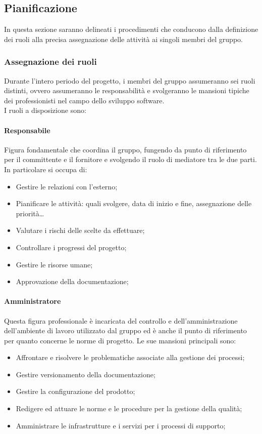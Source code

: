 \documentclass{article}
\begin{document}
    \subsection{Pianificazione}
    In questa sezione saranno delineati i procedimenti che conducono dalla definizione dei ruoli alla precisa assegnazione delle attività ai singoli membri del gruppo.
    \subsubsection{Assegnazione dei ruoli}

    Durante l'intero periodo del progetto, i membri del gruppo assumeranno sei ruoli distinti, ovvero assumeranno le responsabilità e svolgeranno le mansioni tipiche dei professionisti nel campo dello sviluppo software.
    \\I ruoli a disposizione sono:
        \paragraph{Responsabile}\label{responsabile} Figura fondamentale che coordina il gruppo, fungendo da punto di riferimento per il committente e il fornitore e svolgendo il ruolo di mediatore tra le due parti.\\
        In particolare si occupa di:
        \begin{itemize}
            \item Gestire le relazioni con l'esterno;
            \item Pianificare le attività: quali svolgere, data di inizio e fine, assegnazione delle priorità\dots
            \item Valutare i rischi delle scelte da effettuare;
            \item Controllare i progressi del progetto;
            \item Gestire le risorse umane;
            \item Approvazione della documentazione;
        \end{itemize}
        \paragraph{Amministratore}\label{amministratore}Questa figura professionale è incaricata del controllo e dell'amministrazione dell'ambiente di lavoro utilizzato dal gruppo ed è anche il punto di riferimento per quanto concerne le norme di progetto. Le sue mansioni principali sono:
        \begin{itemize}
            \item Affrontare e risolvere le problematiche associate alla gestione dei processi;
            \item Gestire versionamento della documentazione;
            \item Gestire la configurazione del prodotto;
            \item Redigere ed attuare le norme e le procedure per la gestione della qualità;
            \item Amministrare le infrastrutture e i servizi per i processi di supporto;
        \end{itemize}
\end{document}
